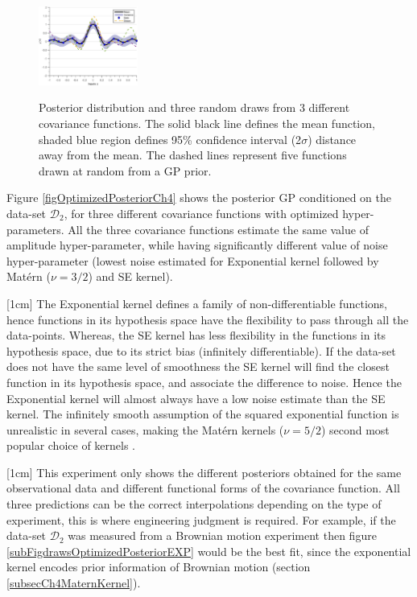 \begin{figure}[!ht]
  {
        \includegraphics[width=0.29\textwidth]
        {images/part2/drawsPosteriorSE}
        \label{subFigdrawsPosteriorSE}
  }\quad
\caption{Posterior distribution and three random draws from 3 different covariance functions. The solid black line defines the mean function, shaded blue region defines 95\% confidence interval (2$\sigma$) distance away from the mean. The dashed lines represent five functions drawn at random from a GP prior. }
       \label{figpreOptimizedPosteriorCh5}
\end{figure}

\begin{mdframed}[hidealllines=true,backgroundcolor=lightgray!20]
Figure \ref{figOptimizedPosteriorCh4} shows the posterior GP conditioned on the data-set $\mathcal{D}_{2}$, for three different covariance functions with optimized hyper-parameters. All the three covariance functions estimate the same value of amplitude hyper-parameter, while having significantly different value of noise hyper-parameter (lowest noise estimated for Exponential kernel followed by Mat\'ern ($\nu=3/2$) and SE kernel). 

[1cm]
The Exponential kernel defines a family of non-differentiable functions, hence functions in its hypothesis space have the flexibility to pass through all the data-points. Whereas, the SE kernel has less flexibility in the functions in its hypothesis space, due to its strict bias (infinitely differentiable). If the data-set does not have the same level of smoothness the SE kernel will find the closest function in its hypothesis space, and associate the difference to noise. Hence the Exponential kernel will almost always have a low noise estimate than the SE kernel. The infinitely smooth assumption of the squared exponential function is unrealistic in several cases, making the Mat\'ern kernels ($\nu=5/2$) second most popular choice of kernels \cite{Stein1999Springer, cornford2002modelling}. 

[1cm]
This experiment only shows the different posteriors obtained for the same observational data and different functional forms of the covariance function. All three predictions can be the correct interpolations depending on the type of experiment, this is where engineering judgment is required. For example, if the data-set $\mathcal{D}_{2}$ was measured from a Brownian motion experiment then figure \ref{subFigdrawsOptimizedPosteriorEXP} would be the best fit, since the exponential kernel encodes prior information of Brownian motion (section \ref{subsecCh4MaternKernel}).

\end{mdframed}

